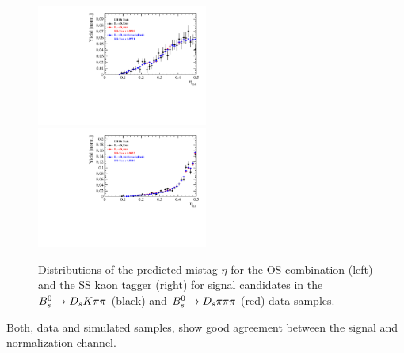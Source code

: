 \begin{figure}[h]
\includegraphics[height=!,width=0.5\textwidth]{figs/dataVsMC/norm2signal/Ds2all_Bs_TAGOMEGA_OS.pdf}
\includegraphics[height=!,width=0.5\textwidth]{figs/dataVsMC/norm2signal/Ds2all_Bs_SS_nnetKaon_PROB.pdf}
\caption{Distributions of the predicted mistag $\eta$ for the OS combination (left) and the SS kaon tagger (right) 
for signal candidates in the ${{B}^0_{s}}\rightarrow{\ensuremath{{D}_{s}}}{\ensuremath{K}}{\ensuremath{\pi}}{\ensuremath{\pi}}$ (black) and ${{B}^0_{s}}\rightarrow{\ensuremath{{D}_{s}}}{\ensuremath{\pi}}{\ensuremath{\pi}}{\ensuremath{\pi}}$ (red) data samples.}
\label{fig:w_data_comparison}
\end{figure}

Both, data and simulated samples, show good agreement between the signal and normalization channel. 



